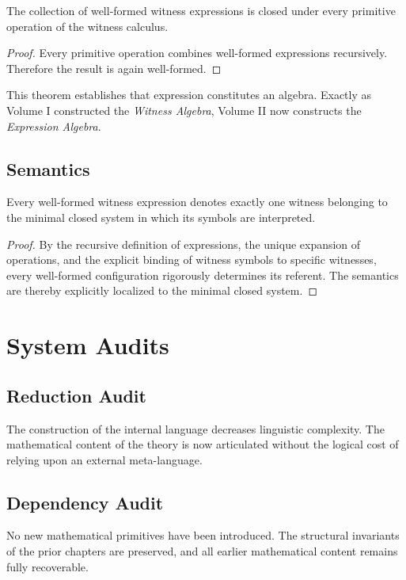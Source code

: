 \documentclass[12pt,anyside]{book}
\begin{document}
\begin{theorem}
The collection of well-formed witness expressions is closed under every primitive operation of the witness calculus.
\end{theorem}
\begin{proof}
Every primitive operation combines well-formed expressions recursively. Therefore the result is again well-formed.
\end{proof}

This theorem establishes that expression constitutes an algebra. Exactly as Volume I constructed the \textit{Witness Algebra}, Volume II now constructs the \textit{Expression Algebra}.

\subsection{Semantics}
\begin{theorem}
Every well-formed witness expression denotes exactly one witness belonging to the minimal closed system in which its symbols are interpreted.
\end{theorem}
\begin{proof}
By the recursive definition of expressions, the unique expansion of operations, and the explicit binding of witness symbols to specific witnesses, every well-formed configuration rigorously determines its referent. The semantics are thereby explicitly localized to the minimal closed system.
\end{proof}

\section{System Audits}

\subsection{Reduction Audit}
The construction of the internal language decreases linguistic complexity. The mathematical content of the theory is now articulated without the logical cost of relying upon an external meta-language.

\subsection{Dependency Audit}
No new mathematical primitives have been introduced. The structural invariants of the prior chapters are preserved, and all earlier mathematical content remains fully recoverable. 
\end{document}
